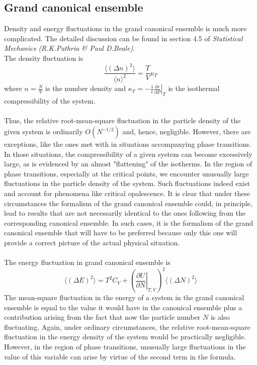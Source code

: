 \documentclass[cyan]{elegantnote}
\begin{document}
\subsection{Grand canonical ensemble}
Density and energy fluctuations in the grand canonical ensemble is much more complicated. The detailed discussion can be found in section 4.5 of \emph{Statistical Mechanics (R.K.Pathria \& Paul D.Beale)}. 
\\
The density fluctuation is
\[\frac{\langle (\Delta n)^2 \rangle}{\langle n \rangle^2} = \frac{T}{V}\kappa_T\]
where $ n = \frac{N}{V}$ is the number density and $\kappa_T = -\frac{1}{v} \left. \frac{\partial v}{\partial P} \right|_{T}$ is the isothermal compressibility of the system.
\\ \\
Thus, the relative root-mean-square fluctuation in the particle density of the given system is ordinarily $O(N^{-1/2})$ and, hence, negligible. However, there are exceptions, like the ones met with in situations accompanying phase transitions. In those situations, the compressibility of a given system can become excessively large, as is evidenced by an almost "flattening" of the isotherms. In the region of phase transitions, especially at the critical points, we encounter unusually large fluctuations in the particle density of the system. Such fluctuations indeed exist and account for phenomena like critical opalescence. It is clear that under these circumstances the formalism of the grand canonical ensemble could, in principle, lead to results that are not necessarily identical to the ones following from the corresponding canonical ensemble. In such cases, it is the formalism of the grand canonical ensemble that will have to be preferred because only this one will provide a correct picture of the actual physical situation.
\\ \\
The energy fluctuation in grand canonical ensemble is 
\[\langle (\Delta E)^2 \rangle = T^2C_V + \left(\left. \frac{\partial U}{\partial N} \right|_{T,V} \right)^2 \langle (\Delta N)^2 \rangle\]
The mean-square fluctuation in the energy of a system in the grand canonical ensemble is equal to the value it would have in the canonical ensemble plus a contribution arising from the fact that now the particle number $N$ is also fluctuating. Again, under ordinary circumstances, the relative root-mean-square fluctuation in the energy density of the system would be practically negligible. However, in the region of phase transitions, unusually large fluctuations in the value of this variable can arise by virtue of the second term in the formula.
\end{document}
